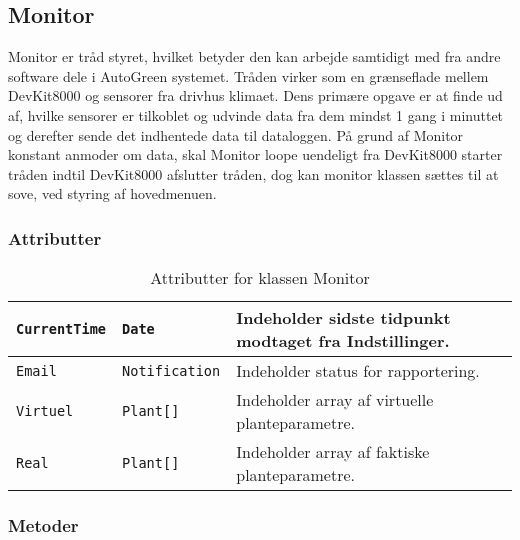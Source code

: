 \subsection{Monitor}

Monitor er tråd styret, hvilket betyder den kan arbejde samtidigt med fra andre software dele i AutoGreen systemet. Tråden virker som en grænseflade mellem DevKit8000 og sensorer fra drivhus klimaet. 
Dens primære opgave er at finde ud af, hvilke sensorer er tilkoblet og udvinde data fra dem mindst 1 gang i minuttet og derefter sende det indhentede data til dataloggen.
På grund af Monitor konstant anmoder om data, skal Monitor loope uendeligt fra DevKit8000 starter tråden indtil DevKit8000 afslutter tråden, dog kan monitor klassen sættes til at sove, ved styring af hovedmenuen.

\subsubsection{Attributter}

\begin{table}[h]
\begin{tabularx}{\textwidth}{| Z | Z | L{10 cm} |} \hline
\texttt{CurrentTime} & \texttt{Date} & Indeholder sidste tidpunkt modtaget fra Indstillinger. \\\hline
\texttt{Email} & \texttt{Notification} & Indeholder status for rapportering. \\\hline
\texttt{Virtuel} & \texttt{Plant[]} & Indeholder array af virtuelle planteparametre. \\\hline
\texttt{Real} & \texttt{Plant[]} & Indeholder array af faktiske planteparametre. \\\hline
\end{tabularx}
\caption{Attributter for klassen Monitor}
\label{table:Monitor_attributter}
\end{table}

\subsubsection{Metoder}

